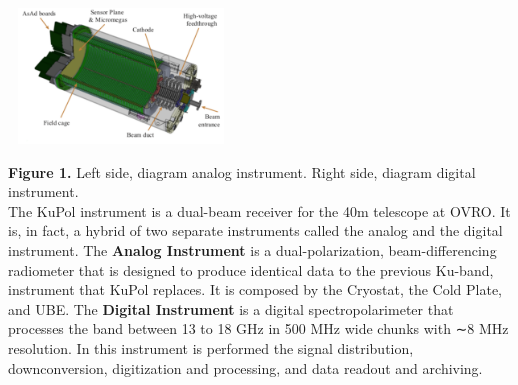 \documentclass[a0paper,portrait]{baposter}
\begin{document}
\begin{poster}
{\begin{center}
\hspace{0.2cm}
\includegraphics [height=36mm, width=60mm] {attpc.png}
\end{center}
\textbf{Figure 1.} Left side, diagram analog instrument. Right side, diagram digital instrument.\\
\small{The KuPol instrument is a dual-beam receiver for the 40m telescope at OVRO. It is, in fact, a hybrid of two separate instruments called the analog and the digital instrument. The \textbf{Analog Instrument} is a dual-polarization, beam-differencing radiometer that is designed to produce identical data to the previous Ku-band, instrument that KuPol replaces. It is composed by the Cryostat, the Cold Plate, and UBE. The \textbf{Digital Instrument} is a digital spectropolarimeter that processes the band between 13 to 18 GHz in 500 MHz wide chunks with ∼8 MHz resolution. In this instrument is performed the signal distribution, downconversion, digitization and processing, and data readout and archiving.}

}
\end{poster}
\end{document}
